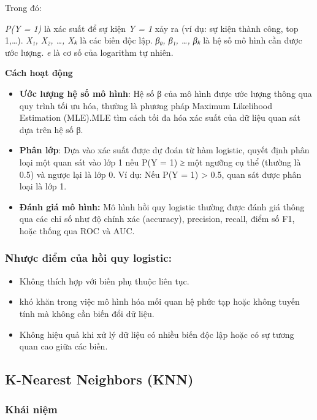 \documentclass[
]{article}
\begin{document}
Trong đó:

\emph{P(Y = 1)} là xác suất để sự kiện \emph{Y = 1} xảy ra (ví dụ: sự
kiện thành công, top 1,\ldots). \emph{X₁, X₂, \ldots, Xₖ} là các biến
độc lập. \emph{β₀, β₁, \ldots, βₖ} là hệ số mô hình cần được ước lượng.
\emph{e} là cơ số của logarithm tự nhiên.

\textbf{Cách hoạt động}

\begin{itemize}
\item
  \textbf{Ước lượng hệ số mô hình}: Hệ số β của mô hình được ước lượng
  thông qua quy trình tối ưu hóa, thường là phương pháp Maximum
  Likelihood Estimation (MLE).MLE tìm cách tối đa hóa xác suất của dữ
  liệu quan sát dựa trên hệ số β.
\item
  \textbf{Phân lớp}: Dựa vào xác suất được dự đoán từ hàm logistic,
  quyết định phân loại một quan sát vào lớp 1 nếu P(Y = 1) ≥ một ngưỡng
  cụ thể (thường là 0.5) và ngược lại là lớp 0. Ví dụ: Nếu P(Y = 1)
  \textgreater{} 0.5, quan sát được phân loại là lớp 1.
\item
  \textbf{Đánh giá mô hình:} Mô hình hồi quy logistic thường được đánh
  giá thông qua các chỉ số như độ chính xác (accuracy), precision,
  recall, điểm số F1, hoặc thống qua ROC và AUC.
\end{itemize}

\subsubsection{Nhược điểm của hồi quy
logistic:}\label{nhux1b0ux1ee3c-ux111iux1ec3m-cux1ee7a-hux1ed3i-quy-logistic}

\begin{itemize}
\item
  Không thích hợp với biến phụ thuộc liên tục.
\item
  khó khăn trong việc mô hình hóa mối quan hệ phức tạp hoặc không tuyến
  tính mà không cần biến đổi dữ liệu.
\item
  Không hiệu quả khi xử lý dữ liệu có nhiều biến độc lập hoặc có sự
  tương quan cao giữa các biến.
\end{itemize}

\subsection{K-Nearest Neighbors (KNN)}\label{k-nearest-neighbors-knn}

\subsubsection{Khái niệm}\label{khuxe1i-niux1ec7m-1}
\end{document}
